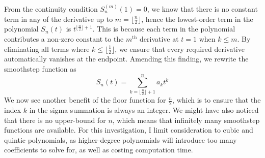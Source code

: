 From the continuity condition $S_n^{(m)}(1)=0$, we know that there is no constant term in any of the derivative up to 
$m=\lfloor\frac{n}{2}\rfloor$, hence the lowest-order term in the polynomial $S_n(t)$ is $t^{\lfloor\frac{n}{2}\rfloor+1}$. This is
because each term in the polynomial contributes a non-zero constant to the $m^{\text{th}}$ derivative at $t=1$ when $k\le m$. By
eliminating all terms where $k\le \lfloor\frac{1}{2}\rfloor$, we ensure that every required derivative automatically vanishes at 
the endpoint. Amending this finding, we rewrite the smoothstep function as
\[S_n(t)=\sum_{k=\lfloor\frac{n}{2}\rfloor+1}^{n}a_kt^k\]
We now see another benefit of the floor function for $\frac{n}{2}$, which is to ensure that the index $k$ in the sigma summation is 
always an integer. We might have also noticed that there is no upper-bound for $n$, which means that infinitely many smoothstep functions 
are available. For this investigation, I limit consideration to cubic and quintic polynomials, as higher-degree polynomials will introduce 
too many coefficients to solve for, as well as costing computation time. 

